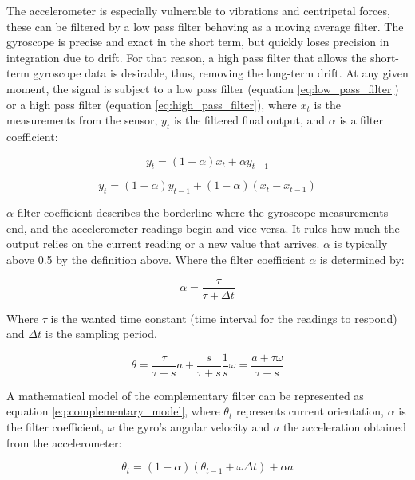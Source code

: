 The accelerometer is especially vulnerable to vibrations and centripetal forces, these can be filtered by a low pass filter behaving as a moving average filter. The gyroscope is precise and exact in the short term, but quickly loses precision in integration due to drift. For that reason, a high pass filter that allows the short-term gyroscope data is desirable, thus, removing the long-term drift.
At any given moment, the signal is subject to a low pass filter (equation \ref{eq:low_pass_filter}) or a high pass filter (equation \ref{eq:high_pass_filter}), where $x_t$ is the measurements from the sensor, $y_t$ is the filtered final output, and $\alpha$ is a filter coefficient:

\begin{equation}
    y_t = (1-\alpha)x_{t} + \alpha y_{t-1}
    \label{eq:low_pass_filter}
\end{equation}

\begin{equation}
    y_t = (1-\alpha)y_{t-1} + (1-\alpha) (x_t - x_{t-1})
    \label{eq:high_pass_filter}
\end{equation}

$\alpha$ filter coefficient describes the borderline where the gyroscope measurements end, and the accelerometer readings begin and vice versa. It rules how much the output relies on the current reading or a new value that arrives. $\alpha$ is typically above 0.5 by the definition above. Where the filter coefficient $\alpha$ is determined by:

\begin{equation}
    \alpha = \frac{\tau}{\tau + \Delta t}
\end{equation}

Where $\tau$ is the wanted time constant (time interval for the readings to respond) and $\Delta t$ is the sampling period.

\begin{equation}
    \theta = \frac{\tau}{\tau + s}a + \frac{s}{\tau + s}\frac{1}{s}\omega = \frac{a+\tau \omega}{\tau + s}
\end{equation}

A mathematical model of the complementary filter can be represented as equation \ref{eq:complementary_model}, where $\theta_t$ represents current orientation, $\alpha$ is the filter coefficient, $\omega$ the gyro's angular velocity and $a$ the acceleration obtained from the accelerometer:

\begin{equation}
    \theta_t = (1 - \alpha) (\theta_{t-1} + \omega \Delta t) + \alpha a
    \label{eq:complementary_model}
\end{equation}

